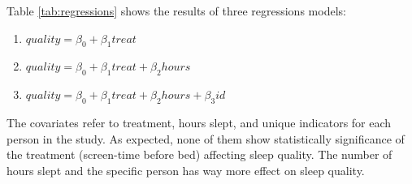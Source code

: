 \documentclass[]{article}
\providecommand{\tightlist}{%
  \setlength{\itemsep}{0pt}\setlength{\parskip}{0pt}}
\begin{document}
Table \ref{tab:regressions} shows the results of three regressions
models:

\begin{enumerate}
\def\labelenumi{\arabic{enumi}.}
\tightlist
\item
  \(quality = \beta_0 + \beta_1 treat\)
\item
  \(quality = \beta_0 + \beta_1 treat + \beta_2 hours\)
\item
  \(quality = \beta_0 + \beta_1 treat + \beta_2 hours + \beta_3 id\)
\end{enumerate}

The covariates refer to treatment, hours slept, and unique indicators
for each person in the study. As expected, none of them show
statistically significance of the treatment (screen-time before bed)
affecting sleep quality. The number of hours slept and the specific
person has way more effect on sleep quality.
\end{document}
